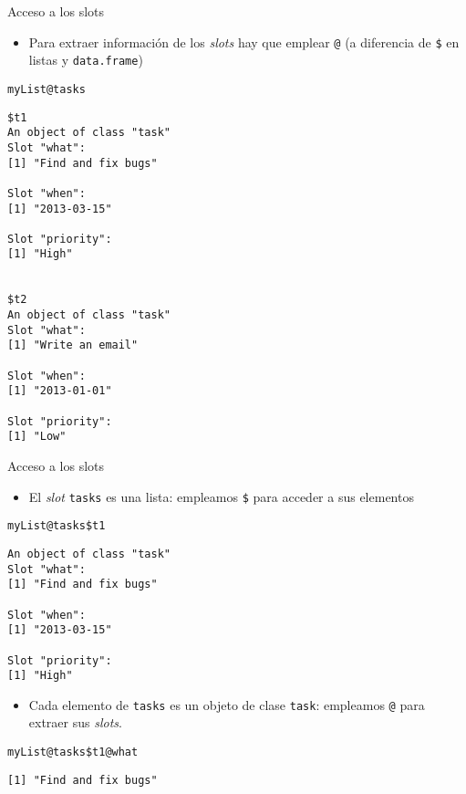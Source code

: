 \documentclass[xcolor={usenames,svgnames,dvipsnames}]{beamer}
\begin{document}
\begin{frame}[fragile,label=sec-3-1-6]{Acceso a los slots}
 \begin{itemize}
\item Para extraer información de los \emph{slots} hay que emplear \texttt{@} (a
diferencia de \texttt{\$} en listas y \texttt{data.frame})
\end{itemize}
\lstset{language=R,numbers=none}
\begin{lstlisting}
myList@tasks
\end{lstlisting}

\begin{verbatim}
$t1
An object of class "task"
Slot "what":
[1] "Find and fix bugs"

Slot "when":
[1] "2013-03-15"

Slot "priority":
[1] "High"


$t2
An object of class "task"
Slot "what":
[1] "Write an email"

Slot "when":
[1] "2013-01-01"

Slot "priority":
[1] "Low"
\end{verbatim}
\end{frame}
\begin{frame}[fragile,label=sec-3-1-7]{Acceso a los slots}
 \begin{itemize}
\item El \emph{slot} \texttt{tasks} es una lista: empleamos \texttt{\$} para acceder a sus elementos
\end{itemize}
\lstset{language=R,numbers=none}
\begin{lstlisting}
myList@tasks$t1
\end{lstlisting}

\begin{verbatim}
An object of class "task"
Slot "what":
[1] "Find and fix bugs"

Slot "when":
[1] "2013-03-15"

Slot "priority":
[1] "High"
\end{verbatim}

\begin{itemize}
\item Cada elemento de \texttt{tasks} es un objeto de clase \texttt{task}: empleamos
  \texttt{@} para extraer sus \emph{slots}.
\end{itemize}
\lstset{language=R,numbers=none}
\begin{lstlisting}
myList@tasks$t1@what
\end{lstlisting}

\begin{verbatim}
[1] "Find and fix bugs"
\end{verbatim}
\end{frame}
\end{document}
